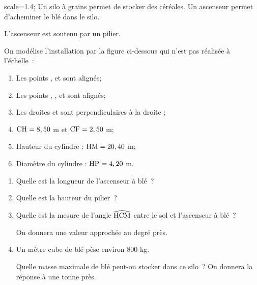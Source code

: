 \documentclass[exercice,a4]{thedocument}%
\begin{document}
%
\!scale=1.4;%
Un silo à grains permet de stocker des céréales. Un ascenseur permet d'acheminer
le blé dans le silo.\par\noindent L'ascenseur est soutenu par un pilier.%
\par\noindent
{\centering{}\par}\medskip
\begin{minipage}[t]{.5\linewidth}
    On modélise l'installation par la figure ci-dessous qui n'est pas réalisée
    à l'échelle~:
    \begin{enumerate}
        \item Les points ,  et 
        sont alignés;
        \item Les points , , 
        et  sont alignés;
        \item Les droites  et  sont
        perpendiculaires à la droite ;
        \item $\text{CH}=8,50$ m et $\text{CF}=2,50$ m;
        \item Hauteur du cylindre : $\text{HM}=20,40$ m;
        \item Diamètre du cylindre : $\text{HP}=4,20$ m. 
    \end{enumerate}
\end{minipage}
\begin{minipage}[t]{.4\linewidth}
\end{minipage}\par\bigskip
{}
\begin{enumerate}
    \item Quelle est la longueur  de l'ascenseur à blé~?
    \item Quelle est la hauteur  du pilier~?
    \item Quelle est la mesure de l'angle $\widehat{\text{HCM}}$
    entre le sol et l'ascenseur à blé~?\par\noindent On donnera une
    valeur approchée au degré près.
    \item Un mètre cube de blé pèse environ 800 kg.\par\noindent
    Quelle masse maximale de blé peut-on stocker dans ce silo~? On
    donnera la réponse à une tonne près.
\end{enumerate}
\end{document}

